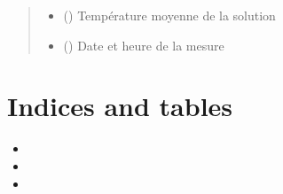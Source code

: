 \documentclass[letterpaper,10pt,french]{sphinxmanual}
\begin{document}
\begin{fulllineitems}
\begin{quote}
\begin{description}
\begin{itemize}
\item {} 
\sphinxAtStartPar
{} () \textendash{} Température moyenne de la solution

\item {} 
\sphinxAtStartPar
{} () \textendash{} Date et heure de la mesure

\end{itemize}


\end{description}\end{quote}

\end{fulllineitems}



\chapter{Indices and tables}
\label{\detokenize{index:indices-and-tables}}\begin{itemize}
\item {} 
\sphinxAtStartPar
{}

\item {} 
\sphinxAtStartPar
{}

\item {} 
\sphinxAtStartPar
{}

\end{itemize}



\renewcommand{\indexname}{Index}
\printindex
\end{document}
